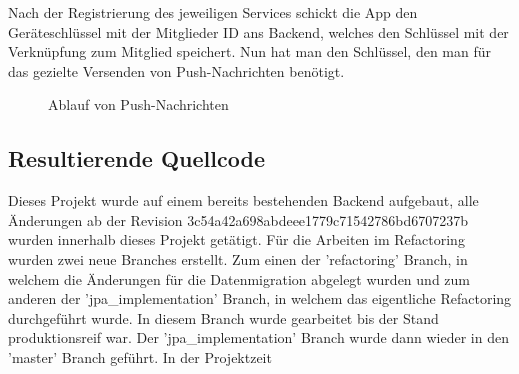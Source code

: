 Nach der Registrierung des jeweiligen Services schickt die App den Geräteschlüssel mit der Mitglieder ID ans Backend, welches den Schlüssel mit der Verknüpfung zum Mitglied speichert. Nun hat man den Schlüssel, den man für das gezielte Versenden von Push-Nachrichten benötigt.
\begin{figure}[ht]
\centering
{}
\label{fig:app_settings}
\caption{Ablauf von Push-Nachrichten}
\end{figure}

\subsection{Resultierende Quellcode}
Dieses Projekt wurde auf einem bereits bestehenden Backend aufgebaut, alle Änderungen ab der Revision 3c54a42a698abdeee1779c71542786bd6707237b wurden innerhalb dieses Projekt getätigt. Für die Arbeiten im Refactoring wurden zwei neue Branches erstellt. Zum einen der 'refactoring' Branch, in welchem die Änderungen für die Datenmigration abgelegt wurden und zum anderen der 'jpa\_implementation' Branch, in welchem das eigentliche Refactoring durchgeführt wurde. In diesem Branch wurde gearbeitet bis der Stand produktionsreif war. Der 'jpa\_implementation' Branch wurde dann wieder in den 'master' Branch geführt. In der Projektzeit 


